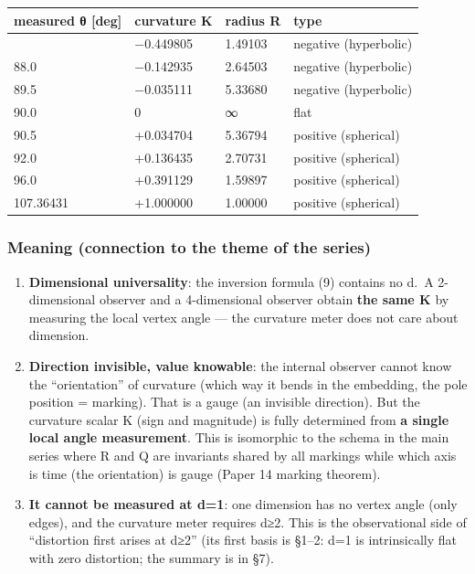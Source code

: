 \documentclass[
]{ltjsarticle}
\newcounter{none} %
\begin{document}
{\def\LTcaptype{none} %
\begin{longtable}[]{@{}llll@{}}
\toprule\noalign{}
measured θ {[}deg{]} & curvature K & radius R & type \\
\midrule\noalign{}
\endhead
\bottomrule\noalign{}
\endlastfoot
84.0 & −0.449805 & 1.49103 & negative (hyperbolic) \\
88.0 & −0.142935 & 2.64503 & negative (hyperbolic) \\
89.5 & −0.035111 & 5.33680 & negative (hyperbolic) \\
90.0 & 0 & ∞ & flat \\
90.5 & +0.034704 & 5.36794 & positive (spherical) \\
92.0 & +0.136435 & 2.70731 & positive (spherical) \\
96.0 & +0.391129 & 1.59897 & positive (spherical) \\
107.36431 & +1.000000 & 1.00000 & positive (spherical) \\
\end{longtable}
}

\subsubsection{Meaning (connection to the theme of the
series)}\label{meaning-connection-to-the-theme-of-the-series}

\begin{enumerate}
\def\labelenumi{(\roman{enumi})}
\item
  \textbf{Dimensional universality}: the inversion formula (9) contains
  no d.~A 2-dimensional observer and a 4-dimensional observer obtain
  \textbf{the same K} by measuring the local vertex angle --- the
  curvature meter does not care about dimension.
\item
  \textbf{Direction invisible, value knowable}: the internal observer
  cannot know the ``orientation'' of curvature (which way it bends in
  the embedding, the pole position = marking). That is a gauge (an
  invisible direction). But the curvature scalar K (sign and magnitude)
  is fully determined from \textbf{a single local angle measurement}.
  This is isomorphic to the schema in the main series where R and Q are
  invariants shared by all markings while which axis is time (the
  orientation) is gauge (Paper 14 marking theorem).
\item
  \textbf{It cannot be measured at d=1}: one dimension has no vertex
  angle (only edges), and the curvature meter requires d≥2. This is the
  observational side of ``distortion first arises at d≥2'' (its first
  basis is §1--2: d=1 is intrinsically flat with zero distortion; the
  summary is in §7).
\end{enumerate}
\end{document}
